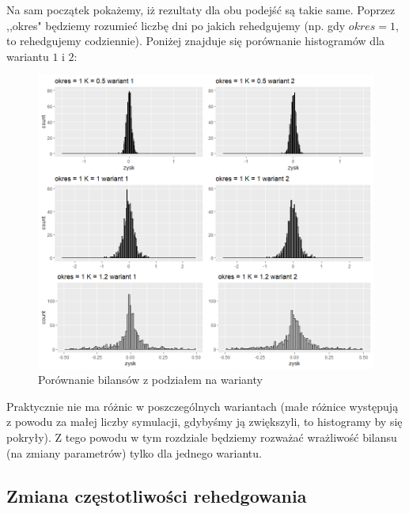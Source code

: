 \documentclass[12pt]{article}
\begin{document}
Na sam początek pokażemy, iż rezultaty dla obu podejść są takie same. Poprzez ,,okres" będziemy rozumieć liczbę dni po jakich rehedgujemy (np. gdy $okres=1$, to rehedgujemy codziennie). Poniżej znajduje się porównanie histogramów dla wariantu $1$ i $2$:
\newpage
\begin{figure}[ht!]
\centering
\includegraphics[width=\linewidth]{porownanie.png}
\caption{Porównanie bilansów z podziałem na warianty}
\end{figure}

Praktycznie nie ma różnic w poszczególnych wariantach (małe różnice występują z powodu za małej liczby symulacji, gdybyśmy ją zwiększyli, to histogramy by się pokryły). Z tego powodu w tym rozdziale będziemy rozważać wrażliwość bilansu (na zmiany parametrów) tylko dla jednego wariantu.
\newpage
\subsection{Zmiana częstotliwości rehedgowania}
\end{document}
